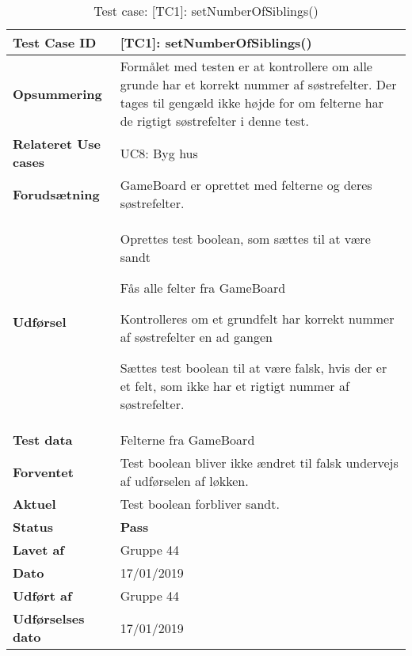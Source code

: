 \documentclass[class=article, crop=false]{standalone}
\begin{document}
    \begin{table}[H]
        \caption{Test case: [TC1]: setNumberOfSiblings()}
        \begin{tabularx}{\textwidth}{|l|X|}
            \hline
            \textbf{Test Case ID }       & \textbf{[TC1]: setNumberOfSiblings()}   \\ \hline
            \textbf{Opsummering}         & Formålet med testen er at kontrollere om alle grunde har et korrekt nummer af søstrefelter.
                                            Der tages til gengæld ikke højde for om felterne har de rigtigt søstrefelter i denne test. \\ \hline
            \textbf{Relateret Use cases}     & UC8: Byg hus \\ \hline
            \textbf{Forudsætning}& GameBoard er oprettet med felterne og deres søstrefelter.\\ \hline
            \textbf{Udførsel}            & \begin{tabenum}
                                               \item Oprettes test boolean, som sættes til at være sandt
                                               \item Fås alle felter fra GameBoard
                                               \item Kontrolleres om et grundfelt har korrekt nummer af søstrefelter en ad gangen
                                               \item Sættes test boolean til at være falsk, hvis der er et felt, som ikke har et rigtigt nummer af søstrefelter.
            \end{tabenum} \\ \hline
            \textbf{Test data}           &  Felterne  fra GameBoard\\ \hline
            \textbf{Forventet} & Test boolean bliver ikke ændret til falsk undervejs af udførselen af løkken.\\    \hline
            \textbf{Aktuel} &  Test boolean forbliver sandt.\\ \hline
            \textbf{Status} & \textbf{Pass} \\ \hline
            \textbf{Lavet af} & Gruppe 44\\ \hline
            \textbf{Dato} & 17/01/2019 \\ \hline
            \textbf{Udført af } & Gruppe 44\\ \hline
            \textbf{Udførselses dato}  & 17/01/2019\\ \hline

\end{tabularx}
\end{table}
\end{document}
